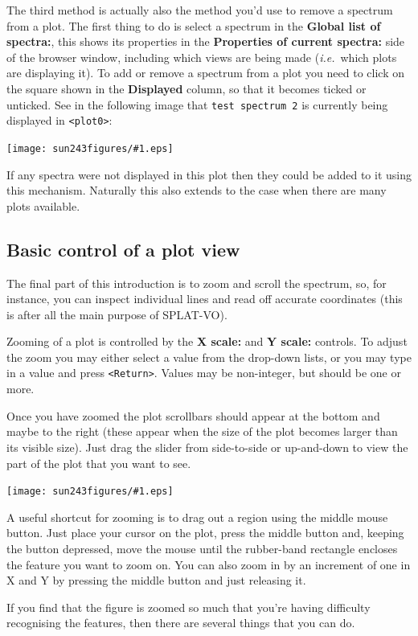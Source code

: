 \documentclass[twoside,11pt]{article}
\newcommand{\htmladdimg}[1]{}
\newcommand{\latexhtml}[2]{#1}
\newcommand{\xlabel}[1]{}
\renewcommand{\_}{\texttt{\symbol{95}}}
\newcommand{\SPLAT}{\textsf{SPLAT-VO}}
\newcommand{\mainfigure}[1]
{\begin{center}
 \latexhtml{\texttt{[image: sun243\_figures/\#1.eps]}}{\htmladdimg{#1.gif}}
 \end{center}
}
\newcommand{\labelitem}[1]{\textbf{#1}}
\newcommand{\hitext}[1]{\texttt{#1}}
\newcommand{\ie}{\textit{i.e.}}
\begin{document}
The third method is actually also the method you'd use to remove a
spectrum from a plot. The first thing to do is select a spectrum in the
\labelitem{Global list of spectra:},
this shows its properties in the
\labelitem{Properties of current spectra:}
side of the browser window, including which views
are being made (\ie\ which plots are displaying it). To add or remove
a spectrum from a plot you need to click on the square shown in the
\labelitem{Displayed} column, so that it becomes ticked or unticked. See
in the following image that \hitext{test spectrum 2} is currently
being displayed in \hitext{<plot0>}:

\mainfigure{browser4}

If any spectra were not displayed in this plot then they could be
added to it using this mechanism. Naturally this also extends to the
case when there are many plots available.

\newpage
\subsection{Basic control of a plot view\xlabel{basic_control}}

The final part of this introduction is to zoom and scroll the
spectrum, so, for instance, you can inspect individual lines and read
off accurate coordinates (this is after all the main purpose of
\SPLAT).

Zooming of a plot is controlled by the \labelitem{X scale:} and
\labelitem{Y scale:} controls. To adjust the zoom you may either select a
value from the drop-down lists, or you may type in a value and press
\hitext{<Return>}. Values may be non-integer, but should be one or more.

Once you have zoomed the plot scrollbars should appear at the bottom
and maybe to the right (these appear when the size of the plot becomes
larger than its visible size). Just drag the slider from side-to-side
or up-and-down to view the part of the plot that you want to see.

\mainfigure{plot4}

A useful shortcut for zooming is to drag out a region using the middle
mouse button. Just place your cursor on the plot, press the middle
button and, keeping the button depressed, move the mouse until the
rubber-band rectangle encloses the feature you want to zoom on. You
can also zoom in by an increment of one in X and Y by pressing the
middle button and just releasing it.

If you find that the figure is zoomed so much that you're having
difficulty recognising the features, then there are several things
that you can do.
\end{document}
